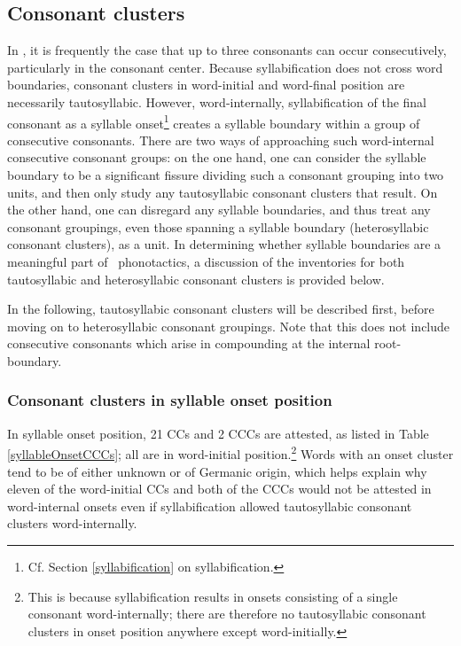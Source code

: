 \subsection{Consonant clusters}\label{CClusters}
In \PS, it is frequently the case that up to three consonants can occur consecutively, particularly in the consonant center. Because syllabification does not cross word boundaries, consonant clusters in word-initial and word-final position are necessarily tautosyllabic. However, word-internally, syllabification of the final consonant as a syllable onset\footnote{Cf. Section \ref{syllabification} on syllabification.} creates a syllable boundary within a group of consecutive consonants. There are two ways of approaching such word-internal consecutive consonant groups: on the one hand, one can consider the syllable boundary to be a significant fissure dividing such a consonant grouping into two units, and then only study any tautosyllabic consonant clusters that result. On the other hand, one can disregard any syllable boundaries, and thus treat any consonant groupings, even those spanning a syllable boundary (heterosyllabic consonant clusters), as a unit. 
In determining whether syllable boundaries are a meaningful part of \PS\ phonotactics, a discussion of the inventories for both tautosyllabic and heterosyllabic consonant clusters is provided below. 

In the following, tautosyllabic consonant clusters will be described first, before moving on to heterosyllabic consonant groupings. Note that this does not include consecutive consonants which arise in compounding at the internal root-boundary.


\subsubsection[CCs in onset position]{Consonant clusters in syllable onset position}
In syllable onset position, 21 CCs and 2 CCCs are attested, as listed in Table \vref{syllableOnsetCCCs}; %
all are in word-initial position.\footnote{This is because syllabification results in onsets consisting of a single consonant word-internally; there are therefore no tautosyllabic consonant clusters in onset position anywhere except word-initially.} 
Words with an onset cluster tend to be of either unknown or of Germanic origin, %
which helps explain why eleven of the word-initial CCs and both of the CCCs would not be attested in word-internal onsets even if syllabification allowed tautosyllabic consonant clusters word-internally. %

